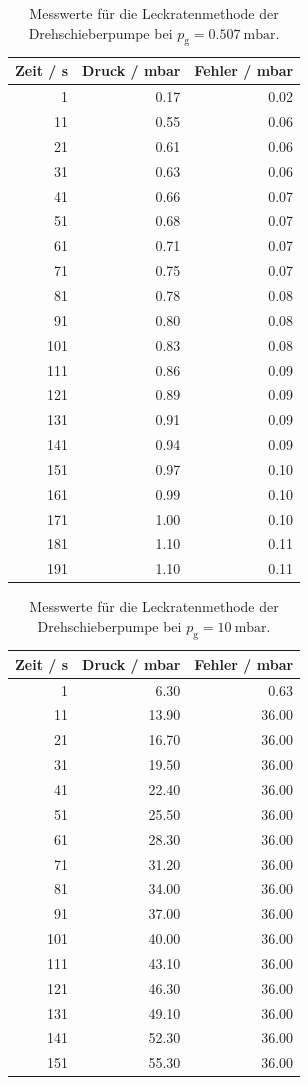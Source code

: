 \begin{table}[H]
\centering
\caption{Messwerte für die Leckratenmethode der Drehschieberpumpe bei $p_\text{g} = \qty{0,507}{\milli\bar}$.}
\label{tab:11}
\begin{tabular}{rrr}
\toprule
Zeit / s & Druck / mbar & Fehler / mbar \\
\midrule
1 & 0.17 & 0.02 \\
11 & 0.55 & 0.06 \\
21 & 0.61 & 0.06 \\
31 & 0.63 & 0.06 \\
41 & 0.66 & 0.07 \\
51 & 0.68 & 0.07 \\
61 & 0.71 & 0.07 \\
71 & 0.75 & 0.07 \\
81 & 0.78 & 0.08 \\
91 & 0.80 & 0.08 \\
101 & 0.83 & 0.08 \\
111 & 0.86 & 0.09 \\
121 & 0.89 & 0.09 \\
131 & 0.91 & 0.09 \\
141 & 0.94 & 0.09 \\
151 & 0.97 & 0.10 \\
161 & 0.99 & 0.10 \\
171 & 1.00 & 0.10 \\
181 & 1.10 & 0.11 \\
191 & 1.10 & 0.11 \\
\bottomrule
\end{tabular}
\end{table}

\begin{table}[H]
  \centering
\caption{Messwerte für die Leckratenmethode der Drehschieberpumpe bei $p_\text{g} = \qty{10}{\milli\bar}$.}
\label{tab:12} 
\begin{tabular}{rrr}
\toprule
Zeit / s & Druck / mbar & Fehler / mbar \\
\midrule
1 & 6.30 & 0.63 \\
11 & 13.90 & 36.00 \\
21 & 16.70 & 36.00 \\
31 & 19.50 & 36.00 \\
41 & 22.40 & 36.00 \\
51 & 25.50 & 36.00 \\
61 & 28.30 & 36.00 \\
71 & 31.20 & 36.00 \\
81 & 34.00 & 36.00 \\
91 & 37.00 & 36.00 \\
101 & 40.00 & 36.00 \\
111 & 43.10 & 36.00 \\
121 & 46.30 & 36.00 \\
131 & 49.10 & 36.00 \\
141 & 52.30 & 36.00 \\
151 & 55.30 & 36.00 \\
\bottomrule
\end{tabular}
\end{table}

